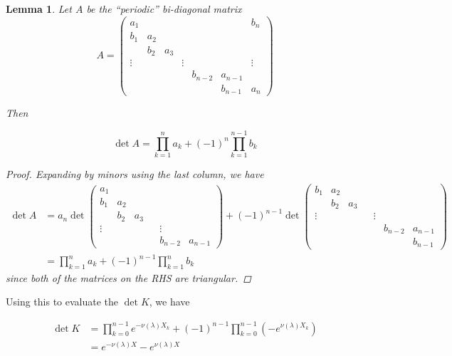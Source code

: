 \documentclass[12pt]{article}
\newtheorem{lemma}{Lemma}
\begin{document}
\begin{lemma}
Let $A$ be the ``periodic'' bi-diagonal matrix
\begin{equation}
A = \begin{pmatrix}
a_1 & & & & & & b_n \\
b_1 & a_2 \\
& b_2 & a_3 \\
\vdots & & & \vdots & &&  \vdots \\
& & & & b_{n-2} & a_{n-1} \\
& & & & & b_{n-1} & a_n
\end{pmatrix}
\end{equation}

Then 

\begin{equation}
\det{A} = \prod_{k = 1}^n a_k + (-1)^n \prod_{k = 1}^{n-1} b_k
\end{equation}

\begin{proof}
Expanding by minors using the last column, we have
\begin{align*}
\det A &= a_n \det
\begin{pmatrix}
a_1 \\
b_1 & a_2 \\
& b_2 & a_3 \\
\vdots & & & & \vdots \\
& & & & b_{n-2} & a_{n-1}
\end{pmatrix}
+ (-1)^{n-1} \det
\begin{pmatrix}
b_1 & a_2 \\
& b_2 & a_3 \\
\vdots & & & & \vdots \\
& & & & & b_{n-2} & a_{n-1} \\
& & & & & & b_{n-1}
\end{pmatrix} \\
&= \prod_{k = 1}^n a_k + (-1)^{n-1} \prod_{k = 1}^n b_k
\end{align*}
since both of the matrices on the RHS are triangular.
\end{proof}
\end{lemma}

Using this to evaluate the $\det K$, we have

\begin{align*}
\det K &= \prod_{k = 0}^{n-1} e^{-\nu(\lambda)X_k} + (-1)^{n-1} \prod_{k = 0}^{n-1} (-e^{\nu(\lambda)X_k}) \\
&= e^{-\nu(\lambda) X} - e^{\nu(\lambda) X}
\end{align*}
\end{document}
